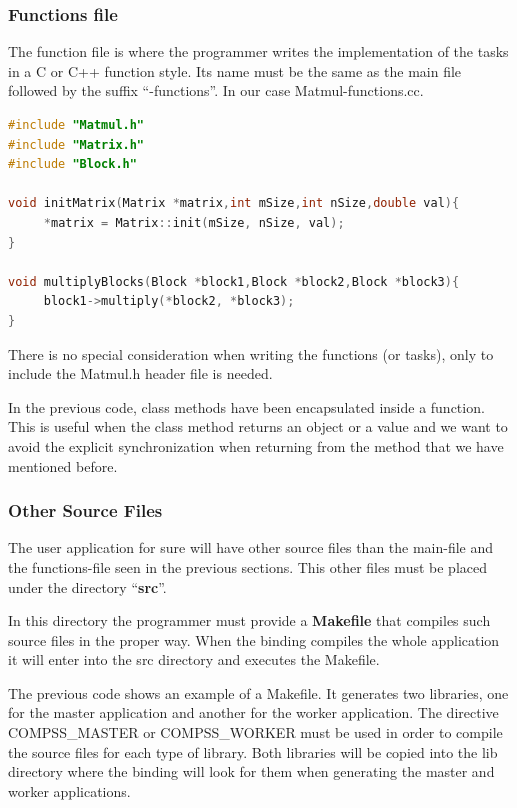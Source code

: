\subsubsection{Functions file}
The function file is where the programmer writes the implementation of the tasks in a C or C++ function style. 
Its name must be the same as the main file followed by the suffix ``-functions''. In our case Matmul-functions.cc.

\begin{lstlisting}[language=C++]
#include "Matmul.h"
#include "Matrix.h"
#include "Block.h"

void initMatrix(Matrix *matrix,int mSize,int nSize,double val){
     *matrix = Matrix::init(mSize, nSize, val);
}

void multiplyBlocks(Block *block1,Block *block2,Block *block3){
     block1->multiply(*block2, *block3);
}
\end{lstlisting}

There is no special consideration when writing the functions (or tasks), only to include the Matmul.h header file is needed.

In the previous code, class methods have been encapsulated inside a function. 
This is useful when the class method returns an object or a value and we want to avoid the explicit 
synchronization when returning from the method that we have mentioned before.

\subsubsection{Other Source Files}
The user application for sure will have other source files than the main-file and the functions-file 
seen in the previous sections. This other files must be placed under the directory ``{\bf src}''.

In this directory the programmer must provide a {\bf Makefile} that compiles such source files in the proper way. 
When the binding compiles the whole application it will enter into the src directory and executes the Makefile.

The previous code shows an example of a Makefile. 
It generates two libraries, one for the master application and another for the worker application. 
The directive COMPSS\_MASTER or COMPSS\_WORKER must be used in order to compile the source files for each type of library. 
Both libraries will be copied into the lib directory where the binding will look for them when generating the master and worker applications.

